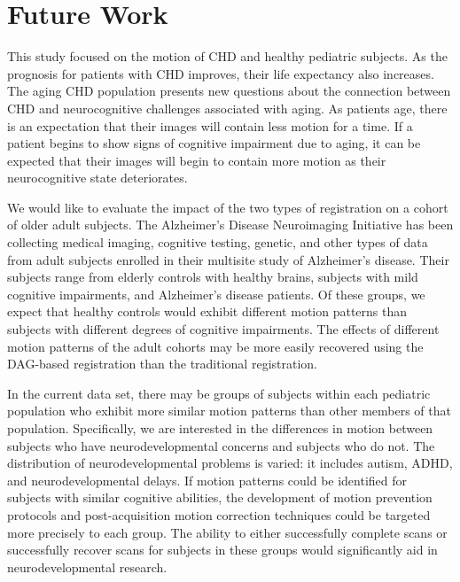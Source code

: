 \section{Future Work}

This study focused on the motion of CHD and healthy pediatric subjects. As the prognosis for patients with CHD improves, their life expectancy also increases. The aging CHD population presents new questions about the connection between CHD and neurocognitive challenges associated with aging. As patients age, there is an expectation that their images will contain less motion for a time. If a patient begins to show signs of cognitive impairment due to aging, it can be expected that their images will begin to contain more motion as their neurocognitive state deteriorates. 

We would like to evaluate the impact of the two types of registration on a cohort of older adult subjects. The Alzheimer's Disease Neuroimaging Initiative has been collecting medical imaging, cognitive testing, genetic, and other types of data from adult subjects enrolled in their multisite study of Alzheimer's disease. Their subjects range from elderly controls with healthy brains, subjects with mild cognitive impairments, and Alzheimer's disease patients. Of these groups, we expect that healthy controls would exhibit different motion patterns than subjects with different degrees of cognitive impairments. The effects of different motion patterns of the adult cohorts may be more easily recovered using the DAG-based registration than the traditional registration.

In the current data set, there may be groups of subjects within each pediatric population who exhibit more similar motion patterns than other members of that population. Specifically, we are interested in the differences in motion between subjects who have neurodevelopmental concerns and subjects who do not. The distribution of neurodevelopmental problems is varied: it includes autism, ADHD, and neurodevelopmental delays. If motion patterns could be identified for subjects with similar cognitive abilities, the development of motion prevention protocols and post-acquisition motion correction techniques could be targeted more precisely to each group. The ability to either successfully complete scans or successfully recover scans for subjects in these groups would significantly aid in neurodevelopmental research.

